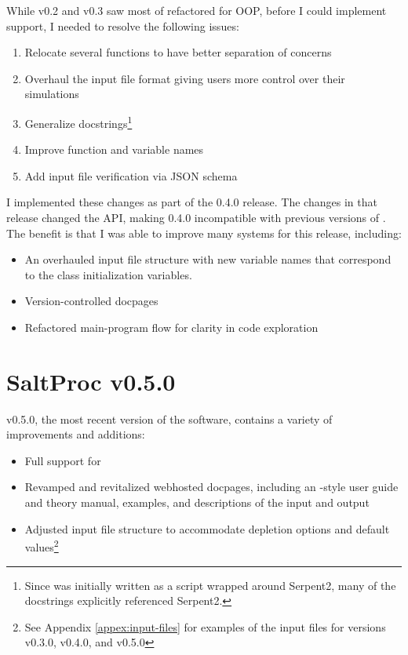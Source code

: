 While v0.2 and v0.3 saw most of \SaltProc refactored for OOP, before I could
implement \OpenMC support, I needed to resolve the following issues:
\begin{enumerate}
    \item Relocate several functions to have better separation of concerns
    \item Overhaul the \SaltProc input file format giving users more control over their simulations
    \item Generalize docstrings\footnote{Since \SaltProc was initially written as a script wrapped around Serpent2, many of the docstrings explicitly referenced Serpent2.}
    \item Improve function and variable names
    \item Add input file verification via JSON schema
\end{enumerate}
I implemented these changes as part of the 0.4.0 release. The changes in that
release changed the API, making 0.4.0 incompatible with previous versions of
\SaltProc. The benefit is that I was able to improve many systems for this
release, including:
\begin{itemize}
    \item An overhauled input file structure with new variable names that
    correspond to the class initialization variables.
    \item Version-controlled docpages
    \item Refactored main-program flow for clarity in code exploration
\end{itemize}

\section{SaltProc v0.5.0}
\label{sec:saltproc-detail}

\SaltProc v0.5.0, the most recent version of the software, contains a variety of
improvements and additions:
\begin{itemize}
    \item Full support for \OpenMC
    \item Revamped and revitalized webhosted docpages, including an
    \OpenMC-style user guide and theory manual, examples, and descriptions of
    the input and output 
    \item Adjusted input file structure to accommodate \OpenMC depletion 
    options and default values\footnote{See Appendix \ref{appex:input-files}
    for examples of the input files for versions v0.3.0, v0.4.0, and v0.5.0}
\end{itemize}

